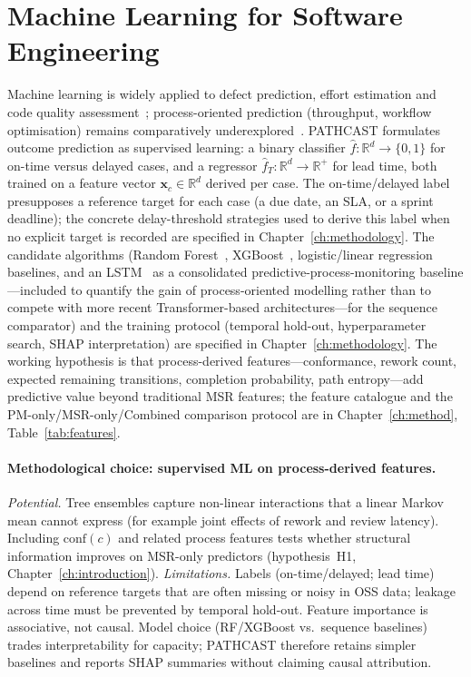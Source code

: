 \section{Machine Learning for Software Engineering}
\label{sec:ml-se}

Machine learning is widely applied to defect prediction, effort
estimation and code quality assessment~\cite{Wahono2015, pachouly2022};
process-oriented prediction (throughput, workflow optimisation) remains
comparatively underexplored~\cite{kotti2023}. PATHCAST formulates outcome
prediction as supervised learning: a binary classifier
$\hat{f}\colon \mathbb{R}^d \to \{0,1\}$ for on-time versus delayed cases,
and a regressor $\hat{f}_T\colon \mathbb{R}^d \to \mathbb{R}^+$ for lead
time, both trained on a feature vector $\mathbf{x}_c \in \mathbb{R}^d$
derived per case. The on-time/delayed label presupposes a reference target
for each case (a due date, an SLA, or a sprint deadline); the concrete
delay-threshold strategies used to derive this label when no explicit target
is recorded are specified in Chapter~\ref{ch:methodology}. The candidate algorithms (Random
Forest~\cite{breiman2001random}, XGBoost~\cite{chen2016xgboost},
logistic/linear regression baselines, and an LSTM~\cite{tax2017} as a
consolidated predictive-process-monitoring baseline---included to quantify
the gain of process-oriented modelling rather than to compete with more
recent Transformer-based architectures---for the
sequence comparator) and the training protocol (temporal hold-out,
hyperparameter search, SHAP interpretation) are specified in
Chapter~\ref{ch:methodology}. The working hypothesis is that
process-derived features---conformance, rework count, expected remaining
transitions, completion probability, path entropy---add predictive value
beyond traditional MSR features; the feature catalogue and the
PM-only/MSR-only/Combined comparison protocol are in Chapter~\ref{ch:method},
Table~\ref{tab:features}.

\paragraph{Methodological choice: supervised ML on process-derived features.}
\emph{Potential.} Tree ensembles capture non-linear interactions that a
linear Markov mean cannot express (for example joint effects of rework and
review latency). Including $\text{conf}(c)$ and related process features
tests whether structural information improves on MSR-only predictors
(hypothesis~H1, Chapter~\ref{ch:introduction}).
\emph{Limitations.} Labels (on-time/delayed; lead time) depend on reference
targets that are often missing or noisy in OSS data; leakage across time
must be prevented by temporal hold-out. Feature importance is associative,
not causal. Model choice (RF/XGBoost vs.\ sequence baselines) trades
interpretability for capacity; PATHCAST therefore retains simpler baselines
and reports SHAP summaries without claiming causal attribution.


